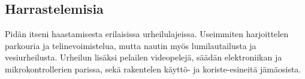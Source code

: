 \documentclass[letterpaper]{twentysecondcv}
\begin{document}
\subsection{Harrastelemisia}
	Pidän itseni haastamisesta erilaisissa urheilulajeissa.
	Useimmiten harjoittelen parkouria ja telinevoimistelua,
	mutta nautin myös lumilautailusta ja vesiurheilusta.
	Urheilun lisäksi pelailen videopelejä, säädän elektroniikan ja mikrokontrollerien parissa,
	sekä rakentelen käyttö- ja koriste-esineitä jämäosista.











\end{document}
